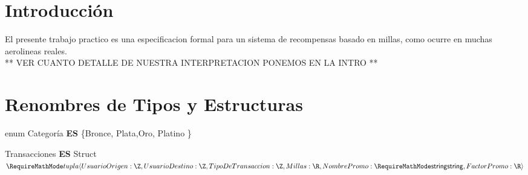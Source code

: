 \documentclass[11pt,a4paper]{article}
\newcommand{\Tipo}[1]{\mathsf{#1}}
\begin{document}
\maketitle
\section{Introducción}

El presente trabajo practico es una especificacion formal para un sistema de recompensas basado en millas, como ocurre en muchas aerolineas reales.
\\
** VER CUANTO DETALLE DE NUESTRA INTERPRETACION PONEMOS EN LA INTRO **

\section{Renombres de Tipos y Estructuras}

\noindent enum Categoría \textbf{ES} \{Bronce, Plata,Oro, Platino  \}

\vspace{0.5cm}

\noindent Transacciones \textbf{ES} Struct $\tupla{			
		UsuarioOrigen: \Tipo{\Z}, \\
		UsuarioDestino: \Tipo{\Z},
		TipoDeTransaccion: \Tipo{\Z},
		Millas: \Tipo{\R}, \\
		NombrePromo: \Tipo{\str},
		FactorPromo: \Tipo{\R}
	}$

\noindent {}

\vspace{2em}
\end{document}
